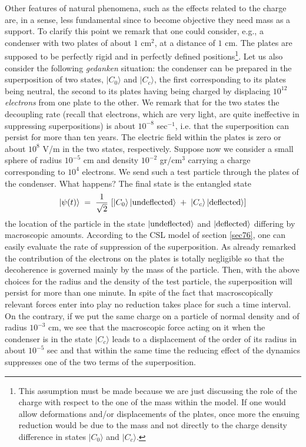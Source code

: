 \documentclass[10pt,a4paper]{article}
\begin{document}
Other features of natural phenomena, such as the effects related
to the charge are, in a sense, less fundamental since to become
objective they need mass as a support. To clarify this point we
remark that one could consider, e.g., a condenser with two plates
of about $1$ cm$^{2}$, at a distance of $1$ cm. The plates are
supposed to be perfectly rigid and in perfectly defined
positions\footnote{This assumption must be made because we are
just discussing the role of the charge with respect to the one of
the mass within the model. If one would allow deformations and/or
displacements of the plates, once more the ensuing reduction would
be due to the mass and not directly to the charge density
difference in states $|C_{0}\rangle$ and $|C_{c}\rangle$.}. Let us
also consider the following {\it gedanken} situation: the
condenser can be prepared in the superposition of two states,
$|C_{0}\rangle$ and $|C_{c}\rangle$, the first corresponding to
its plates being neutral, the second to its plates having being
charged by displacing $10^{12}$ {\it electrons} from one plate to
the other. We remark that for the two states the decoupling rate
(recall that electrons, which are very light, are quite
ineffective in suppressing superpositions) is about $10^{-8}$
sec$^{-1}$, i.e. that the superposition can persist for more than
ten years. The electric field within the plates is zero or about
$10^{8}$ V/m in the two states, respectively. Suppose now we
consider a small sphere of radius $10^{-5}$ cm and density
$10^{-2}$ gr/cm$^{3}$ carrying a charge corresponding to $10^{4}$
electrons. We send such a test particle through the plates of the
condenser. What
 happens? The final state is the entangled state
\begin{equation}
|\psi(t)\rangle \; = \; \frac{1}{\sqrt{2}}\,\left[|C_{0}\rangle\,
|\makebox{undeflected}\rangle \; + \; |C_{c}\rangle\,
|\makebox{deflected}\rangle \right]
\end{equation}
the location of the particle in the state
$|\makebox{undeflected}\rangle$ and $|\makebox{deflected}\rangle$
differing by macroscopic amounts. According to the CSL model of
section \ref{sec76}, one can easily evaluate the rate of
suppression of the superposition. As already remarked the
contribution of the electrons on the plates is totally negligible
so that the decoherence is governed mainly by the mass of the
particle. Then, with the above choices for the radius and the
density of the test particle, the superposition will persist for
more than one minute. In spite of the fact that macroscopically
relevant forces enter into play no reduction takes place for such
a time interval. On the contrary, if we put the same charge on a
particle of normal density and of radius $10^{-3}$ cm, we see that
the macroscopic force acting on it when the condenser is in the
state $|C_{c}\rangle$ leads to a displacement of the order of its
radius in about $10^{-5}$ sec and that within the same time the
reducing effect of the dynamics suppresses one of the two terms of
the superposition.
\end{document}
